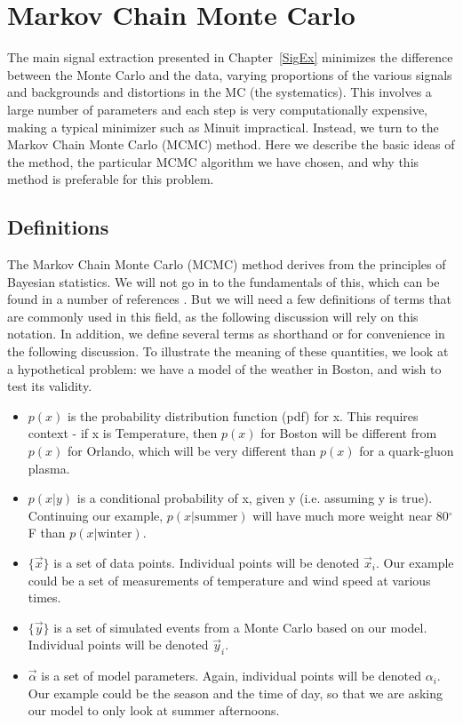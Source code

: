 
\chapter{Markov Chain Monte Carlo}
\label{MCMC}
The main signal extraction presented in \mbox{Chapter \ref{SigEx}}
minimizes the difference between the Monte Carlo and the data, varying
proportions of the various signals and backgrounds and distortions in
the MC (the systematics).  This involves a large number of parameters
and each step is very computationally expensive, making a typical
minimizer such as Minuit \cite{Minuit} impractical.  Instead, we turn
to the Markov Chain Monte Carlo (MCMC) method.  Here we describe the
basic ideas of the method, the particular MCMC algorithm we have
chosen, and why this method is preferable for this problem.

\section{Definitions}
The Markov Chain Monte Carlo (MCMC) method derives from the principles
of Bayesian statistics.  We will not go in to the fundamentals of
this, which can be found in a number of references
\cite{ref:DataAnalysisBook, BayesianIntro}.  But we will need a few
definitions of terms that are commonly used in this field, as the
following discussion will rely on this notation.  In addition, we
define several terms as shorthand or for convenience in the following
discussion.  To illustrate the meaning of these quantities, we look at
a hypothetical problem: we have a model of the weather in Boston, and
wish to test its validity.

\begin{itemize}
\item[ ] $p(x)$ is the probability distribution function (pdf) for x.
  This requires context - if x is Temperature, then $p(x)$ for Boston
  will be different from $p(x)$ for Orlando, which will be very
  different than $p(x)$ for a quark-gluon plasma.
\item[ ] $p(x|y)$ is a conditional probability of x, given y
  (i.e. assuming y is true).  Continuing our example,
  $p(x|\mathrm{summer})$ will have much more weight near 80$^\circ$F
  than $p(x|\mathrm{winter})$.
\item[ ] $\{\vec{x}\}$ is a set of data points.  Individual points
  will be denoted $\vec{x}_i$.  Our example could be a set of
  measurements of temperature and wind speed at various times.
\item[ ] $\{\vec{y}\}$ is a set of simulated events from a Monte Carlo
  based on our model.  Individual points will be denoted $\vec{y}_i$.
\item[ ] $\vec{\alpha}$ is a set of model parameters.  Again,
  individual points will be denoted $\alpha_i$.  Our example could be
  the season and the time of day, so that we are asking our model to
  only look at summer afternoons.
\end{itemize}



